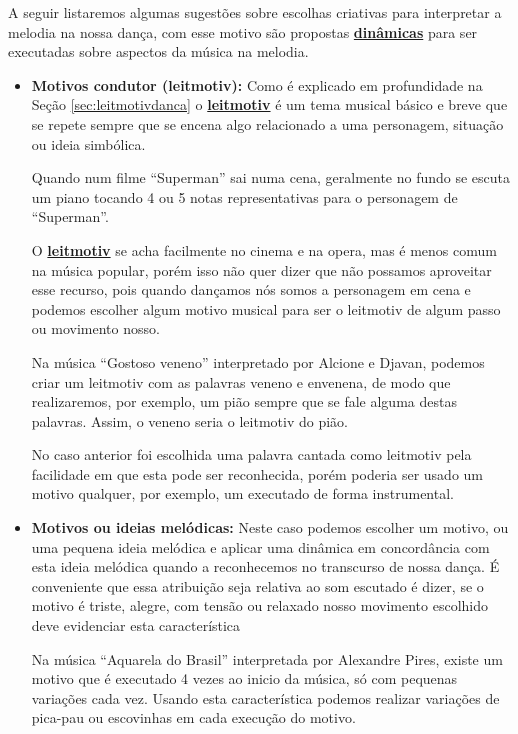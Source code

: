A seguir listaremos algumas sugestões sobre escolhas criativas para interpretar a melodia na nossa dança,
com esse motivo são propostas \hyperref[sec:musicalidade:dinamicas]{\textbf{dinâmicas}} para ser executadas sobre aspectos da música na melodia. 
\begin{itemize}
\item \textbf{Motivos condutor (leitmotiv):} Como é explicado em profundidade na Seção \ref{sec:leitmotivdanca}
o \hyperref[sec:leitmotivdanca]{\textbf{leitmotiv}} é um tema musical básico e 
breve que se repete sempre que se encena algo relacionado a uma personagem, 
situação ou ideia simbólica.
\begin{example} Quando num filme ``Superman'' sai numa cena, geralmente no 
fundo se escuta um piano tocando 4 ou 5 notas representativas para o personagem de ``Superman''. 
\end{example}
O \hyperref[sec:leitmotivdanca]{\textbf{leitmotiv}} se acha facilmente no cinema e na opera, 
mas é menos comum na música popular, porém isso não quer dizer que não possamos aproveitar esse recurso,
pois quando dançamos nós somos a personagem em cena e podemos escolher algum motivo 
musical para ser o leitmotiv de algum passo ou movimento nosso.
\begin{example}
Na música ``Gostoso veneno'' interpretado por  Alcione e Djavan, 
podemos criar um leitmotiv com as palavras veneno e envenena,
de modo que realizaremos, por exemplo, um pião sempre que se fale alguma destas palavras.
Assim, o veneno seria o leitmotiv do pião.
\end{example}  
No caso anterior
foi escolhida uma palavra cantada como leitmotiv 
pela facilidade em que esta pode ser reconhecida, porém poderia ser usado
um motivo qualquer, por exemplo, um executado de forma instrumental.
\item \textbf{Motivos ou ideias melódicas:} Neste caso podemos escolher um motivo, 
ou uma pequena ideia melódica e aplicar uma dinâmica em concordância com esta ideia melódica
quando a reconhecemos no transcurso de nossa dança. 
É conveniente que essa atribuição seja relativa ao som escutado é dizer, 
se o motivo é triste, alegre, com tensão ou relaxado
 nosso movimento escolhido deve evidenciar esta característica
\begin{example}
Na música ``Aquarela do Brasil'' interpretada por Alexandre Pires, 
existe um motivo que é executado 4 vezes ao inicio da música, 
só com pequenas variações cada vez. 
Usando esta característica podemos realizar variações de pica-pau ou escovinhas em cada execução do motivo. 

\end{example}
\end{itemize}

